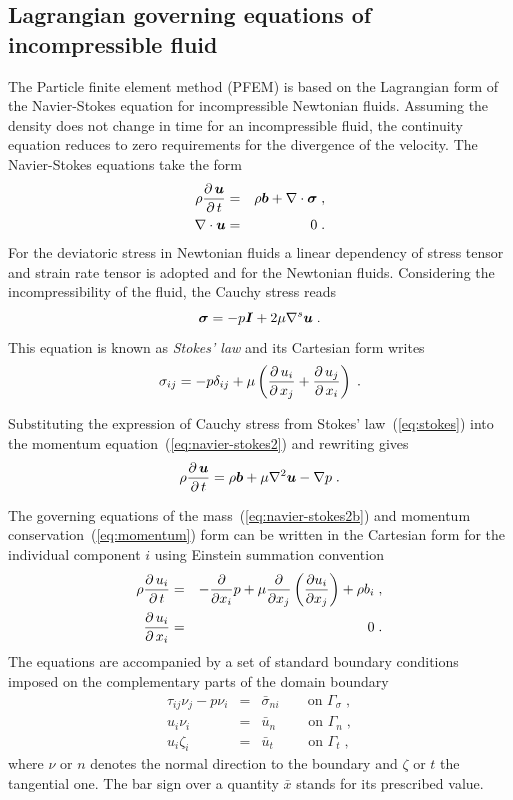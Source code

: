 \subsection{Lagrangian governing equations of incompressible fluid}
The Particle finite element method (PFEM) is based on the Lagrangian form of the Navier-Stokes equation for incompressible Newtonian fluids. Assuming the density does not change in time for an incompressible fluid, the continuity equation reduces to zero requirements for the divergence of the velocity. The Navier-Stokes equations take the form
\begin{eqnarray}
\rho\mbox{$\displaystyle\frac{\partial \,{\mbox{\boldmath$u$}}}{\partial \,{t}}$} &=& \rho\mbox{\boldmath$b$} + \nabla\cdot\mbox{\boldmath$\sigma$} \label{eq:navier-stokes2}\;,\\
\nabla\cdot\mbox{\boldmath$u$} &=& 0\;. \label{eq:navier-stokes2b}
\end{eqnarray}
For the deviatoric stress in Newtonian fluids a linear dependency of stress tensor and strain rate tensor is adopted and for the Newtonian fluids. Considering the incompressibility of the fluid, the Cauchy stress reads
\begin{equation}\label{eq:stokes}
\mbox{\boldmath$\sigma$}=-p\mbox{\boldmath$I$} + 2\mu \nabla^s\mbox{\boldmath$u$}\;.
\end{equation}
This equation is known as \emph{Stokes' law} and its Cartesian form writes
\begin{equation}
\sigma_{ij}=-p\delta_{ij}+\mu\left(\mbox{$\displaystyle\frac{\partial \,{u_i}}{\partial \,{x_j}}$}+\mbox{$\displaystyle\frac{\partial \,{u_j}}{\partial \,{x_i}}$}\right)\;.
\end{equation}
\par
Substituting the expression of Cauchy stress from Stokes' law~(\ref{eq:stokes}) into the momentum equation~(\ref{eq:navier-stokes2}) and rewriting gives
\begin{equation}
\rho\mbox{$\displaystyle\frac{\partial \,{\mbox{\boldmath$u$}}}{\partial \,{t}}$} = \rho\mbox{\boldmath$b$} + \mu\nabla^2\mbox{\boldmath$u$} - \nabla p\;.\label{eq:momentum}
\end{equation}
\par
The governing equations of the mass~(\ref{eq:navier-stokes2b}) and momentum conservation~(\ref{eq:momentum}) form can be written in the Cartesian form for the individual component $i$ using Einstein summation convention
\begin{eqnarray}
\rho \mbox{$\displaystyle\frac{\partial \,{u_i}}{\partial \,{t}}$} &=& - \frac{\partial}{\partial x_i}p+\mu\frac{\partial}{\partial x_j}\left(\frac{\partial u_i}{\partial x_j}\right)+\rho b_i \;, \label{eq:mb}\\
\mbox{$\displaystyle\frac{\partial \,{u_i}}{\partial \,{x_i}}$} &=& 0\;.
\end{eqnarray}
The equations are accompanied by a set of standard boundary conditions imposed on the complementary parts of the domain boundary
\begin{eqnarray}
  \tau_{ij}\nu_j - p\nu_i &=& \bar \sigma_{ni} \qquad \mbox{on } \Gamma_{\sigma}\;, \\
  u_i\nu_i &=& \bar u_n \qquad\; \mbox{on } \Gamma_n\;, \\
  u_i\zeta_i &=& \bar u_t \qquad\;\, \mbox{on } \Gamma_t\;,
\end{eqnarray}
where $\nu$ or $n$ denotes the normal direction to the boundary and $\zeta$ or $t$ the tangential one. The bar sign over a quantity $\bar x$ stands for its prescribed value.

